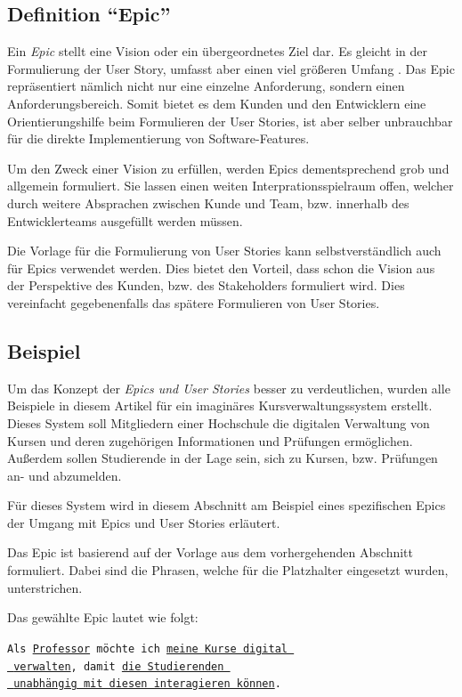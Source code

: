 \documentclass[acmtog]{acmart}
\begin{document}

\subsection{Definition ``Epic''}
Ein \emph{Epic} stellt eine Vision oder ein übergeordnetes Ziel dar.
Es gleicht in der Formulierung der User Story, umfasst aber einen viel größeren Umfang \cite[pp. 6, 14]{cohn_user_2004}.
Das Epic repräsentiert nämlich nicht nur eine einzelne Anforderung, sondern einen Anforderungsbereich.
Somit bietet es dem Kunden und den Entwicklern eine Orientierungshilfe beim Formulieren der User Stories,
ist aber selber unbrauchbar für die direkte Implementierung von Software-Features.

Um den Zweck einer Vision zu erfüllen, werden Epics dementsprechend grob und allgemein formuliert.
Sie lassen einen weiten Interprationsspielraum offen, welcher durch weitere Absprachen zwischen
Kunde und Team, bzw. innerhalb des Entwicklerteams ausgefüllt werden müssen.

Die Vorlage für die Formulierung von User Stories kann selbstverständlich auch für Epics verwendet werden.
Dies bietet den Vorteil, dass schon die Vision aus der Perspektive des Kunden, bzw. des Stakeholders formuliert
wird. Dies vereinfacht gegebenenfalls das spätere Formulieren von User Stories.

\subsection{Beispiel}
Um das Konzept der \emph{Epics und User Stories} besser zu verdeutlichen, wurden alle Beispiele in diesem
Artikel für ein imaginäres Kursverwaltungssystem erstellt.
Dieses System soll Mitgliedern einer Hochschule die digitalen Verwaltung von Kursen und deren zugehörigen Informationen
und Prüfungen ermöglichen.
Außerdem sollen Studierende in der Lage sein, sich zu Kursen, bzw. Prüfungen an- und abzumelden.

Für dieses System wird in diesem Abschnitt am Beispiel eines spezifischen Epics der Umgang mit Epics und User Stories erläutert.

Das Epic ist basierend auf der Vorlage aus dem vorhergehenden Abschnitt formuliert.
Dabei sind die Phrasen, welche für die Platzhalter eingesetzt wurden, unterstrichen.

Das gewählte Epic lautet wie folgt:

\vspace{1em}
\texttt{Als \underline{Professor} möchte ich \underline{meine Kurse digital }\\
	\hspace*{3em}\underline{ verwalten}, damit \underline{die Studierenden }\\
	\hspace*{4em} \underline{ unabhängig mit diesen interagieren können}.}
\vspace{1em}
\end{document}
